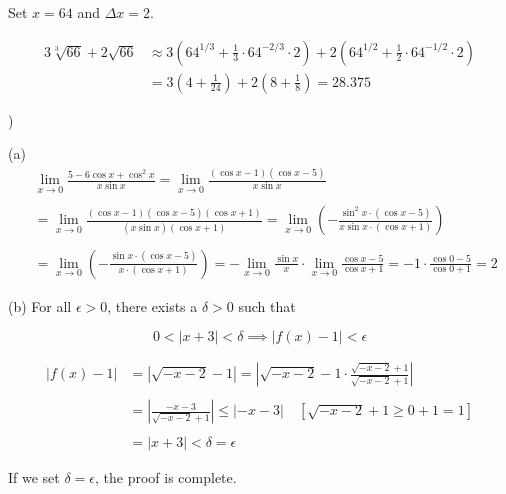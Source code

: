 \documentclass{article}
\begin{document}
\hfill

\noindent Set $x = 64$ and $\Delta x = 2$.

\begin{align*}3\sqrt[3]{66}+2\sqrt{66}&\approx3\left(64^{1/3}+\frac13\cdot64^{-2/3}\cdot2\right)+2\left(64^{1/2}+\frac{1}2\cdot64^{-1/2}\cdot2\right)\\&=3\left(4+\frac1{24}\right)+2\left(8+\frac18\right)=\boxed{28.375}\end{align*}

\newpage

)

\hfill

\noindent (a) \begin{align*}
&\lim_{x\to0}\frac{5-6\cos x + \cos^2x}{x\sin x}=\lim_{x\to0}\frac{(\cos x -1)(\cos x-5)}{x\sin x} \\\\&=\lim_{x\to0}\frac{(\cos x -1)(\cos x-5)(\cos x +1)}{(x\sin x)(\cos x +1)}
=\lim_{x\to0}\left(-\frac{\sin^2x\cdot(\cos x -5)}{x\sin x \cdot(\cos x +1)}\right)\\\\&=\lim_{x\to0}\left(-\frac{\sin x\cdot(\cos x -5)}{x \cdot(\cos x +1)}\right)=-\lim_{x\to0}\frac{\sin{x}} x\cdot \lim_{x\to0}\frac{\cos x -5}{\cos x +1}=-1\cdot\frac{\cos0 -5}{\cos0+1} = \boxed{2}
\end{align*}

\hfill

\noindent (b) For all $\epsilon > 0$, there exists a $\delta > 0$ such that

\begin{equation*}0<\left|x+3\right| < \delta\implies\left|f(x) - 1\right| < \epsilon\end{equation*}

\begin{align*}
\left|f(x) - 1\right|&=\left|\sqrt{-x-2}-1\right| = \left|\sqrt{-x-2}-1\cdot\frac{\sqrt{-x-2}+1}{\sqrt{-x-2}+1}\right|\\\\&=\left|\frac{-x-3}{\sqrt{-x-2}+1}\right|\leq \left|-x-3\right|\quad\left[\sqrt{-x-2} + 1\geq0+1=1\right]\\\\&=\left|x+3\right|<\delta=\epsilon
\end{align*}

\hfill

\noindent If we set $\delta=\epsilon$, the proof is complete.

\hfill
\end{document}

